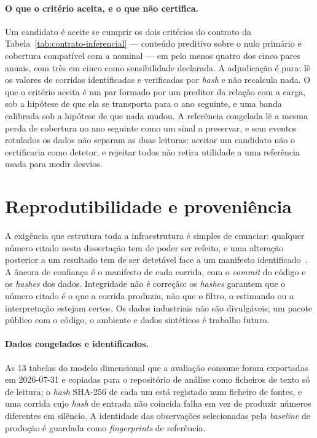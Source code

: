 \paragraph{O que o critério aceita, e o que não certifica.} Um candidato é
aceite se cumprir os dois critérios do contrato da
Tabela~\ref{tab:contrato-inferencial} --- conteúdo preditivo sobre o nulo
primário e cobertura compatível com a nominal --- em pelo menos quatro dos
cinco pares anuais, com três em cinco como sensibilidade declarada. A
adjudicação é pura: lê os valores de corridas identificadas e verificadas por
\emph{hash} e não recalcula nada. O que o critério aceita é um par formado
por um preditor da relação com a carga, sob a hipótese de que ela se
transporta para o ano seguinte, e uma banda calibrada sob a hipótese de que
nada mudou. A referência congelada lê a mesma perda de cobertura no ano
seguinte como um sinal a preservar, e sem eventos rotulados os dados não
separam as duas leituras: aceitar um candidato não o certificaria como
detetor, e rejeitar todos não retira utilidade a uma referência usada para
medir desvios.

\section{Reprodutibilidade e proveniência}
\label{sec:reprodutibilidade}

A exigência que estrutura toda a infraestrutura é simples de enunciar:
qualquer número citado nesta dissertação tem de poder ser refeito, e uma
alteração posterior a um resultado tem de ser detetável face a um manifesto
identificado~\cite{Peng2011,Sandve2013}. A âncora de confiança é o manifesto
de cada corrida, com o \emph{commit} do código e os \emph{hashes} dos dados.
Integridade não é correção: os \emph{hashes} garantem que o número citado é o
que a corrida produziu, não que o filtro, o estimando ou a interpretação
estejam certos. Os dados industriais não são divulgáveis; um pacote público
com o código, o ambiente e dados sintéticos é trabalho futuro.

\paragraph{Dados congelados e identificados.} As 13 tabelas do modelo
dimensional que a avaliação consome foram exportadas em 2026-07-31 e
copiadas para o repositório de análise como ficheiros de texto só de
leitura; o \emph{hash} SHA-256 de cada um está registado num ficheiro de
fontes, e uma corrida cujo \emph{hash} de entrada não coincida falha em vez
de produzir números diferentes em silêncio. A identidade das observações
selecionadas pela \emph{baseline} de produção é guardada como
\emph{fingerprints} de referência.


